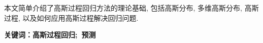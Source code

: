 \setcounter{page}{1} %
    \newpage %
    \begin{center}
    \end{center}

    {\wuhao 本文简单介绍了高斯过程回归方法的理论基础, 包括高斯分布, 多维高斯分布, 高斯过程, 以及如何应用高斯过程解决回归问题.}

    {\wuhao
    \bfseries{关键词：高斯过程回归;\ 预测} }



